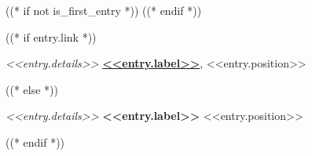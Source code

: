 ((* if not is_first_entry *))
\vspace{<<design.margins.entry_area.vertical_between>>}
((* endif *))

((* if entry.link *))
\begin{twocolentry}
    {%
    \textit{<<entry.details>>} %
    }{%
        \textbf{\href{<<entry.link>>}{<<entry.label>>}}, <<entry.position>> %
    }
\end{twocolentry}
((* else *))
\begin{twocolentry}
    {%
    \textit{<<entry.details>>} %
    }{%
    \textbf{<<entry.label>>} <<entry.position>> %
    }
\end{twocolentry}
((* endif *))